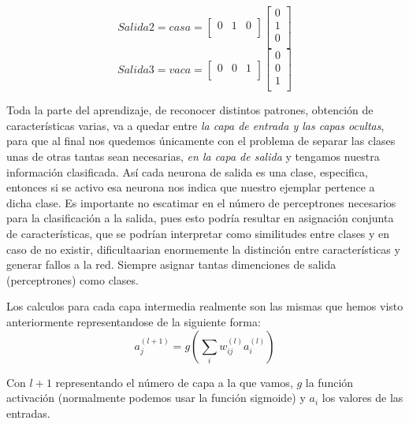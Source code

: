 $$
Salida 2 = casa =
\begin{bmatrix}
  0 & 1 & 0 \\
  \end{bmatrix}
\begin{bmatrix}
  0 \\
  1 \\
  0 \\
  \end{bmatrix}
$$
$$
Salida 3 = vaca =
\begin{bmatrix}
  0 & 0 & 1 \\
  \end{bmatrix}
\begin{bmatrix}
  0 \\ 
  0 \\ 
  1 \\
  \end{bmatrix}
$$

Toda la parte del aprendizaje, de reconocer distintos patrones, obtención de características varias, va a quedar entre \emph{la capa de entrada y las capas ocultas}, para que al final nos quedemos únicamente con el problema de separar las clases unas de otras tantas sean necesarias, \emph{en la capa de salida} y tengamos nuestra información clasificada. Así cada neurona de salida es una clase, especifica, entonces si se activo esa neurona nos indica que nuestro ejemplar pertence a dicha clase. Es importante no escatimar en el número de perceptrones necesarios para la clasificación a la salida, pues esto podría resultar en asignación conjunta de características, que se podrían interpretar como similitudes entre clases y en caso de no existir, dificultaarian enormemente la distinción entre características y generar fallos a la red. Siempre asignar tantas dimenciones de salida (perceptrones) como clases.

Los calculos para cada capa intermedia realmente son las mismas que hemos visto anteriormente representandose de la siguiente forma:
\begin{equation}
 a_{j}^{(l+1)} = g \left( \sum_{i} w_{ij}^{(l)}a_{i}^{(l)} \right)
\end{equation}

Con $l+1$ representando el número de capa a la que vamos, $g$ la función activación (normalmente podemos usar la función sigmoide) y $a_i$ los valores de las entradas. 


